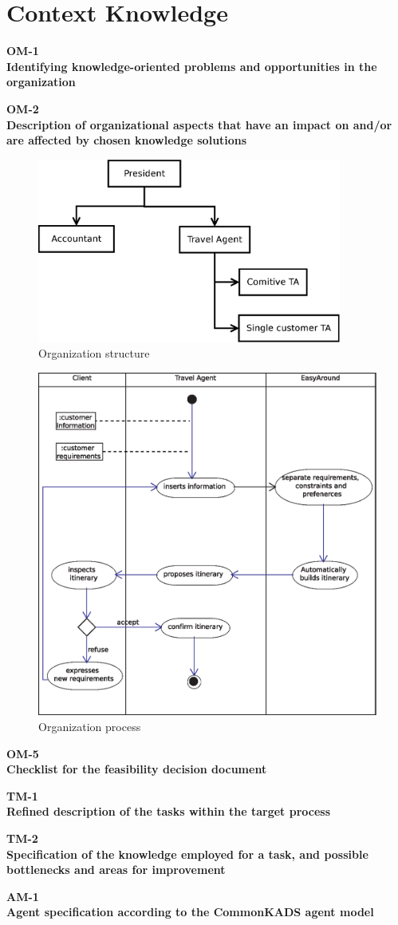 \documentclass[11pt]{article} %
\def\worksheet#1#2{%
  \begin{center}
  {\large\bf #1} \\
  {\normalsize\bf #2} \\[12pt]
  \begin{footnotesize}
  
  \end{footnotesize}
  \end{center}  
  \vfill}
\begin{document}
\section{Context Knowledge}
\worksheet{OM-1}{Identifying knowledge-oriented problems and
opportunities in the organization}
\worksheet{OM-2}{Description of organizational aspects that
have an impact on and/or are affected by chosen knowledge solutions}
\begin{figure}[H]
\centering
\includegraphics[width=10cm]{images/azienda.eps}
\caption{Organization structure}
\label{fig:orgStructure}
\end{figure}
\begin{figure}[H]
\centering
\includegraphics[width=\textwidth]{images/activity.eps}
\caption{Organization process}
\label{fig:orgProcess}
\end{figure}
\worksheet{OM-5}{Checklist for the feasibility decision
document}
\worksheet{TM-1}{Refined description of the tasks within the
target process}
\worksheet{TM-2}{Specification of the knowledge employed for a
task, and possible bottlenecks and areas for improvement}
\worksheet{AM-1}{Agent specification according to the
CommonKADS agent model}
\end{document}
